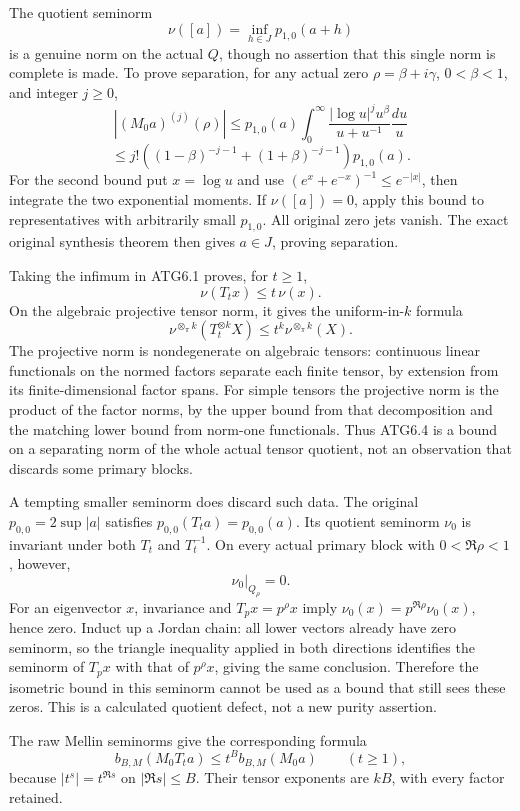 The quotient seminorm \[
\nu([a])=\inf_{h\in J}p_{1,0}(a+h)
\tag{ATG6.2}
\] is a genuine norm on the actual \(Q\), though no assertion that this
single norm is complete is made. To prove separation, for any actual
zero \(\rho=\beta+i\gamma\), \(0<\beta<1\), and integer \(j\ge0\), \[
|(M_0a)^{(j)}(\rho)|
\le p_{1,0}(a)
 \int_0^\infty\frac{|\log u|^j u^\beta}{u+u^{-1}}\frac{du}{u}
\] \[
\le j!\left((1-\beta)^{-j-1}+(1+\beta)^{-j-1}\right)p_{1,0}(a).
\tag{ATG6.3}
\] For the second bound put \(x=\log u\) and use
\((e^x+e^{-x})^{-1}\le e^{-|x|}\), then integrate the two exponential
moments. If \(\nu([a])=0\), apply this bound to representatives with
arbitrarily small \(p_{1,0}\). All original zero jets vanish. The exact
original synthesis theorem then gives \(a\in J\), proving separation.

Taking the infimum in ATG6.1 proves, for \(t\ge1\), \[
\nu(T_t x)\le t\,\nu(x).
\] On the algebraic projective tensor norm, it gives the
uniform-in-\(k\) formula \[
\boxed{\nu^{\otimes_\pi k}(T_t^{\otimes k}X)
 \le t^k\nu^{\otimes_\pi k}(X).}
\tag{ATG6.4}
\] The projective norm is nondegenerate on algebraic tensors: continuous
linear functionals on the normed factors separate each finite tensor, by
extension from its finite-dimensional factor spans. For simple tensors
the projective norm is the product of the factor norms, by the upper
bound from that decomposition and the matching lower bound from norm-one
functionals. Thus ATG6.4 is a bound on a separating norm of the whole
actual tensor quotient, not an observation that discards some primary
blocks.

A tempting smaller seminorm does discard such data. The original
\(p_{0,0}=2\sup|a|\) satisfies \(p_{0,0}(T_ta)=p_{0,0}(a)\). Its
quotient seminorm \(\nu_0\) is invariant under both \(T_t\) and
\(T_t^{-1}\). On every actual primary block with \(0<\Re\rho<1\),
however, \[
\nu_0|_{Q_\rho}=0.
\tag{ATG6.5}
\] For an eigenvector \(x\), invariance and \(T_px=p^\rho x\) imply
\(\nu_0(x)=p^{\Re\rho}\nu_0(x)\), hence zero. Induct up a Jordan chain:
all lower vectors already have zero seminorm, so the triangle inequality
applied in both directions identifies the seminorm of \(T_px\) with that
of \(p^\rho x\), giving the same conclusion. Therefore the isometric
bound in this seminorm cannot be used as a bound that still sees these
zeros. This is a calculated quotient defect, not a new purity assertion.

The raw Mellin seminorms give the corresponding formula \[
b_{B,M}(M_0T_ta)\le t^B b_{B,M}(M_0a)\qquad(t\ge1),
\tag{ATG6.6}
\] because \(|t^s|=t^{\Re s}\) on \(|\Re s|\le B\). Their tensor
exponents are \(kB\), with every factor retained.

